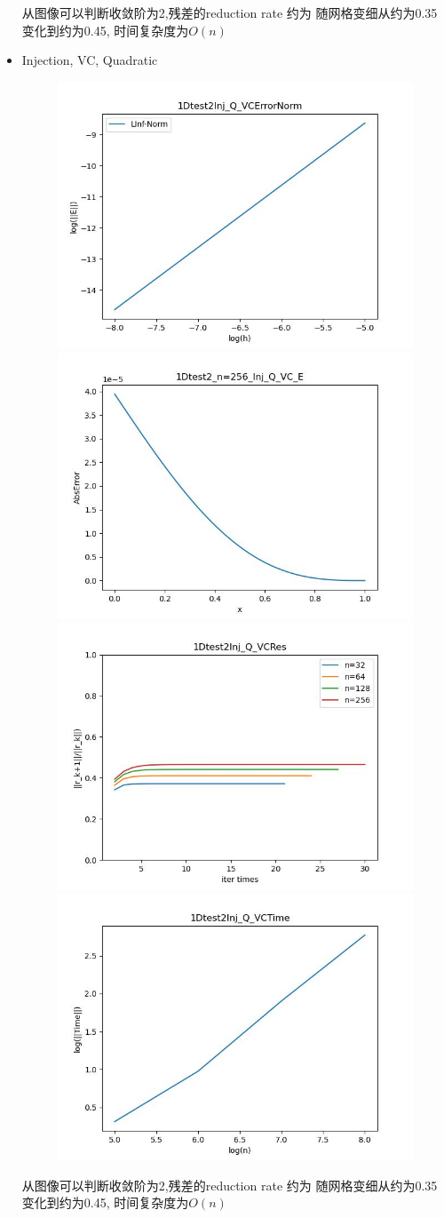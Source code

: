 \documentclass{article}
\begin{document}
\begin{itemize}
    从图像可以判断收敛阶为2,残差的reduction rate 约为 随网格变细从约为0.35变化到约为0.45, 时间复杂度为$O(n)$
    \newpage
    \item Injection, VC, Quadratic
    \begin{figure}[h]
        \centering
        \includegraphics[width=0.35\linewidth]{1Dtest2Inj_Q_VCErrorNorm.jpg}
        \includegraphics[width=0.35\linewidth]{1Dtest2_n=256_Inj_Q_VC_E.jpg}
        \includegraphics[width=0.35\linewidth]{1Dtest2Inj_Q_VCRes.jpg}
        \includegraphics[width=0.35\linewidth]{1Dtest2Inj_Q_VCTime.jpg}
    \end{figure}
    
    从图像可以判断收敛阶为2,残差的reduction rate 约为 随网格变细从约为0.35变化到约为0.45, 时间复杂度为$O(n)$

\end{itemize}
\end{document}
